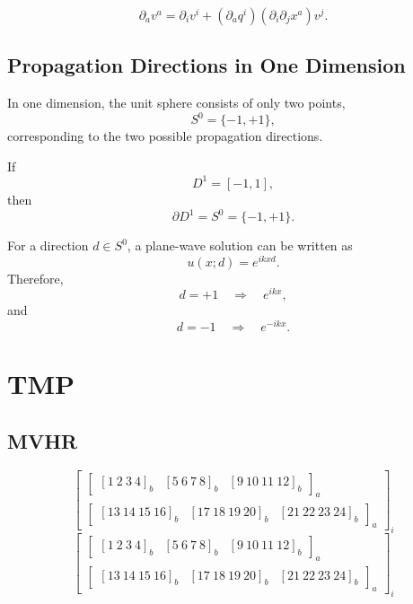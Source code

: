 \[
    \partial_a v^a
    =
    \partial_i v^i
    +
    (\partial_aq^i)(\partial_i\partial_jx^a)v^j.
\]


\subsection{Propagation Directions in One Dimension}
In one dimension, the unit sphere consists of only two points,
\[
    S^0=\{-1,+1\},
\]
corresponding to the two possible propagation directions.

If
\[
    D^1=[-1,1],
\]
then
\[
    \partial D^1=S^0=\{-1,+1\}.
\]

For a direction $d\in S^0$, a plane-wave solution can be written as
\[
    u(x;d)=e^{ikxd}.
\]
Therefore,
\[
    d=+1 \quad\Longrightarrow\quad e^{ikx},
\]
and
\[
    d=-1 \quad\Longrightarrow\quad e^{-ikx}.
\]





\section{TMP}


\subsection{MVHR}
$$
    \boxed{
        \left[
            \begin{array}{c}
                \left[
                    \begin{array}{ccc}
                        [1\ 2\ 3\ 4]_{b} &
                        [5\ 6\ 7\ 8]_{b} &
                        [9\ 10\ 11\ 12]_{b}
                    \end{array}
                    \right]_{a}
                \\[12pt]
                \left[
                    \begin{array}{ccc}
                        [13\ 14\ 15\ 16]_{b} &
                        [17\ 18\ 19\ 20]_{b} &
                        [21\ 22\ 23\ 24]_{b}
                    \end{array}
                    \right]_{a}
            \end{array}
            \right]_{i}
    }
$$
\[
    \left[
        \begin{array}{c}
            \left[
                \begin{array}{ccc}
                    [1\ 2\ 3\ 4]_{b} & [5\ 6\ 7\ 8]_{b} & [9\ 10\ 11\ 12]_{b}
                \end{array}
                \right]_{a}
            \\
            \left[
                \begin{array}{ccc}
                    [13\ 14\ 15\ 16]_{b} & [17\ 18\ 19\ 20]_{b} & [21\ 22\ 23\ 24]_{b}
                \end{array}
                \right]_{a}
        \end{array}
        \right]_{i}
\]

